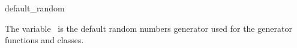 \begin{ccRefVariable}{default_random}

\ccDefinition

The variable \ccRefName\ is the default random numbers generator used for
the generator functions and classes.




\end{ccRefVariable}

